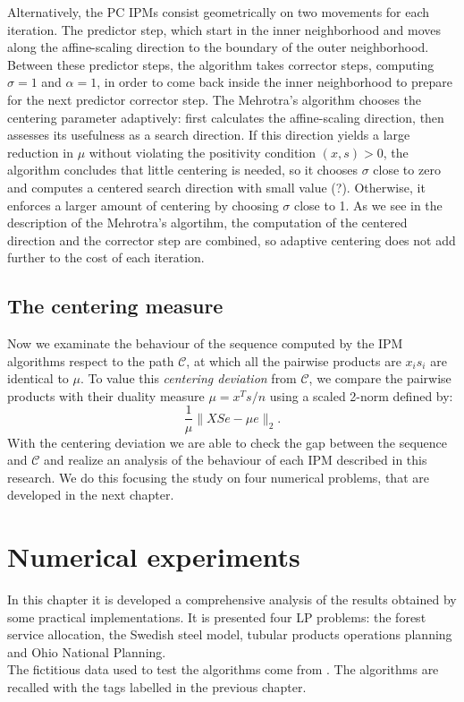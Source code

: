 \documentclass[a4paper,10 pt,titlepage,twoside]{book}
\theoremstyle{plain}
\theoremstyle{definition}
\theoremstyle{remark}
\begin{document}
Alternatively, the PC IPMs consist geometrically on two movements for each iteration. The predictor step, which start in the inner neighborhood and moves along the affine-scaling direction to the boundary of the outer neighborhood. Between these predictor steps, the algorithm takes corrector steps, computing $\sigma = 1$ and $\alpha= 1$, in order to come back inside the inner neighborhood to prepare for the next predictor corrector step. The Mehrotra's algorithm chooses the centering parameter adaptively: first calculates the affine-scaling direction, then assesses its usefulness as a search direction. If this direction yields a large reduction in $\mu$ without violating the positivity condition $(x, s)> 0$, the algorithm concludes that little centering is needed, so it chooses $\sigma$ close to zero and computes a centered search direction with small value (?). Otherwise, it enforces a larger amount of centering by choosing $\sigma$ close to 1. As we see in the description of the Mehrotra's algortihm, the computation of the centered direction and the corrector step are combined, so adaptive centering does not add further to the cost of each iteration. 

\section*{The centering measure}
Now we examinate the behaviour of the sequence computed by the IPM algorithms respect to the path $\mathcal{C}$, at which all the pairwise products are $x_{i}s_{i}$ are identical to $\mu$. To value this \textit{centering deviation} from $\mathcal{C}$, we compare the pairwise products with their duality measure $\mu = x^{T}s/n$ using a scaled 2-norm defined by: 
\begin{equation}\label{cendev}
\frac{1}{\mu}\lVert XSe - \mu e \rVert_{2}.
\end{equation}
With the centering deviation we are able to check the gap between the sequence and $\mathcal{C}$ and realize an analysis of the behaviour of each IPM described in this research. We do this focusing the study on four numerical problems, that are developed in the next chapter.  

\chapter{Numerical experiments}
In this chapter it is developed a comprehensive analysis of the results obtained by some practical implementations. It is presented four LP problems: the forest service allocation, the Swedish steel model, tubular products operations planning and Ohio National Planning.\\
The fictitious data used to test the algorithms come from \cite{RR}.
The algorithms are recalled with the tags labelled in the previous chapter.
\end{document}
